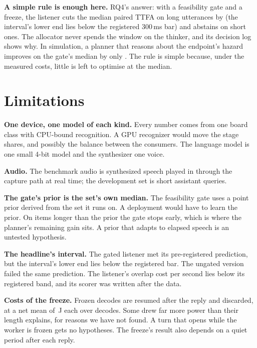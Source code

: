 \textbf{A simple rule is enough here.} RQ4's answer: with a feasibility gate
and a freeze, the listener cuts the median paired TTFA on long utterances by
\PthreeRed{} (the interval's lower end lies below the registered 300\,ms bar) and abstains on short ones. The allocator never spends
the window
on the thinker, and its decision log shows why. In simulation, a planner that
reasons about the endpoint's hazard improves on the gate's median by only
\PlannerDP. The rule is simple because, under the measured costs, little is
left to optimise at the median.

\section{Limitations}
\label{sec:limitations}

\textbf{One device, one model of each kind.} Every number comes from one
board class with CPU-bound recognition. A GPU recognizer would move the stage
shares, and possibly the balance between the consumers. The language model is
one small 4-bit model and the synthesizer one voice.

\textbf{Audio.} The benchmark audio is synthesized speech played in through
the capture path at real time; the development set is short assistant queries.

\textbf{The gate's prior is the set's own median.} The feasibility gate uses a
point prior derived from the set it runs on. A deployment would have to learn
the prior. On items longer than the prior the gate stops early, which is where
the planner's remaining gain sits. A prior that adapts to elapsed speech is an
untested hypothesis.

\textbf{The headline's interval.} The gated listener met its pre-registered
prediction, but the interval's lower end lies below the registered bar. The
ungated version failed the same prediction. The listener's overlap cost per
second lies below its registered band, and its scorer was written after the
data.

\textbf{Costs of the freeze.} Frozen decodes are resumed after the reply and
discarded, at a net mean of \StaleMean\,J each over \StaleN{} decodes. Some
drew far more power than their length explains, for reasons we have not
found. A turn that opens while the worker is frozen gets no hypotheses. The
freeze's result also depends on a quiet period after each reply.

